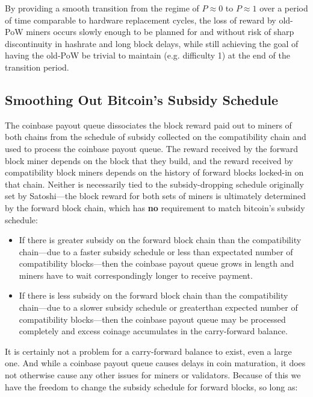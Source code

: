 By providing a smooth transition from the regime of $P \approx 0$ to
$P \approx 1$ over a period of time comparable to hardware replacement
cycles, the loss of reward by old-PoW miners occurs slowly enough to
be planned for and without risk of sharp discontinuity in hashrate and
long block delays, while still achieving the goal of having the
old-PoW be trivial to maintain (e.g. difficulty \num{1}) at the end of
the transition period.

\subsection{Smoothing Out Bitcoin's Subsidy Schedule}

The coinbase payout queue dissociates the block reward paid out to
miners of both chains from the schedule of subsidy collected on the
compatibility chain and used to process the coinbase payout queue.
The reward received by the forward block miner depends on the block
that they build, and the reward received by compatibility block miners
depends on the history of forward blocks locked-in on that chain.
Neither is necessarily tied to the subsidy-dropping schedule
originally set by Satoshi---the block reward for both sets of miners
is ultimately determined by the forward block chain, which has
\textbf{no} requirement to match bitcoin's subsidy schedule:

\begin{itemize}

  \item

    If there is greater subsidy on the forward block chain than the
    compatibility chain---due to a faster subsidy schedule or less
    than expectated number of compatibility blocks---then the coinbase
    payout queue grows in length and miners have to wait
    correspondingly longer to receive payment.

  \item

    If there is less subsidy on the forward block chain than the
    compatibility chain---due to a slower subsidy schedule or
    greaterthan expected number of compatibility blocks---then the
    coinbase payout queue may be processed completely and excess
    coinage accumulates in the carry-forward balance.

\end{itemize}

It is certainly not a problem for a carry-forward balance to exist,
even a large one.  And while a coinbase payout queue causes delays in
coin maturation, it does not otherwise cause any other issues for
miners or validators.  Because of this we have the freedom to change
the subsidy schedule for forward blocks, so long as:


